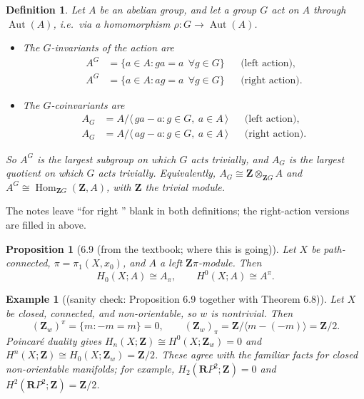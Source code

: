 \documentclass[11pt]{article}
\newcommand{\Z}{\mathbf{Z}}
\newcommand{\RP}{\mathbf{R}P}
\newcommand{\Zpi}{\Z\pi}
\DeclareMathOperator{\Hom}{Hom}
\DeclareMathOperator{\Aut}{Aut}
\newcommand{\iso}{\cong}
\theoremstyle{namedit}
\newtheorem{prop}{Proposition}
\theoremstyle{namedrm}
\newtheorem{defn}{Definition}
\newtheorem{ex}{Example}
\begin{document}
\begin{defn}
Let $A$ be an abelian group, and let a group $G$ act on $A$ through $\Aut(A)$, i.e.\ via a homomorphism
$\rho\colon G\to\Aut(A)$.
\begin{itemize}
  \item The \emph{$G$-invariants} of the action are
        \begin{align*}
          A^G&=\{a\in A: ga=a\ \ \forall g\in G\} && \text{(left action)},\\
          A^G&=\{a\in A: ag=a\ \ \forall g\in G\} && \text{(right action)}.
        \end{align*}
  \item The \emph{$G$-coinvariants} are
        \begin{align*}
          A_G&=A\big/\langle\,ga-a: g\in G,\ a\in A\,\rangle && \text{(left action)},\\
          A_G&=A\big/\langle\,ag-a: g\in G,\ a\in A\,\rangle && \text{(right action)}.
        \end{align*}
\end{itemize}
So $A^G$ is the largest subgroup on which $G$ acts trivially, and $A_G$ is the largest quotient on which
$G$ acts trivially. Equivalently, $A_G\iso\Z\otimes_{\Z G}A$ and $A^G\iso\Hom_{\Z G}(\Z,A)$, with $\Z$ the
trivial module.
\end{defn}

\begin{filled}
The notes leave ``for right \underline{\quad}'' blank in both definitions; the right-action versions are
filled in above.
\end{filled}

\begin{prop}[6.9 (from the textbook; where this is going)]
Let $X$ be path-connected, $\pi=\pi_1(X,x_0)$, and $A$ a left $\Zpi$-module. Then
\[
  H_0(X;A)\iso A_\pi,\qquad H^0(X;A)\iso A^\pi .
\]
\end{prop}

\begin{ex}[(sanity check: Proposition 6.9 together with Theorem 6.8)]
Let $X$ be closed, connected, and non-orientable, so $w$ is nontrivial. Then
\[
  (\Z_w)^\pi=\{m: -m=m\}=0,\qquad (\Z_w)_\pi=\Z/\langle m-(-m)\rangle=\Z/2 .
\]
Poincar\'e duality gives $H_n(X;\Z)\iso H^0(X;\Z_w)=0$ and $H^n(X;\Z)\iso H_0(X;\Z_w)=\Z/2$. These
agree with the familiar facts for closed non-orientable manifolds; for example,
$H_2(\RP^2;\Z)=0$ and $H^2(\RP^2;\Z)=\Z/2$.
\end{ex}
\end{document}
